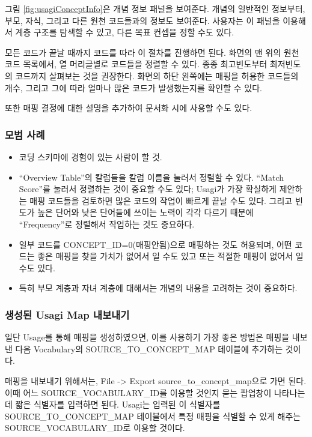 \documentclass[11pt]{book}
\providecommand{\tightlist}{%
  \setlength{\itemsep}{0pt}\setlength{\parskip}{0pt}}
\theoremstyle{definition}
\theoremstyle{definition}
\theoremstyle{definition}
\theoremstyle{remark}
\begin{document}
그림 \ref{fig:usagiConceptInfo}은 개념 정보 패널을 보여준다. 개념의
일반적인 정보부터, 부모, 자식, 그리고 다른 원천 코드들과의 정보도
보여준다. 사용자는 이 패널을 이용해서 계층 구조를 탐색할 수 있고, 다른
목표 컨셉을 정할 수도 있다.

모든 코드가 끝날 때까지 코드를 따라 이 절차를 진행하면 된다. 화면의 맨
위의 원천 코드 목록에서, 열 머리글별로 코드들을 정렬할 수 있다. 종종
최고빈도부터 최저빈도의 코드까지 살펴보는 것을 권장한다. 화면의 하단
왼쪽에는 매핑을 허용한 코드들의 개수, 그리고 그에 따라 얼마나 많은
코드가 발생했는지를 확인할 수 있다.

또한 매핑 결정에 대한 설명을 추가하여 문서화 시에 사용할 수도 있다.

\subsubsection*{모범 사례}\label{-}

\begin{itemize}
\tightlist
\item
  코딩 스키마에 경험이 있는 사람이 할 것.
\item
  ``Overview Table''의 칼럼들을 칼럼 이름을 눌러서 정렬할 수 있다.
  ``Match Score''를 눌러서 정렬하는 것이 중요할 수도 있다; Usagi가 가장
  확실하게 제안하는 매핑 코드들을 검토하면 많은 코드의 작업이 빠르게
  끝날 수도 있다. 그리고 빈도가 높은 단어와 낮은 단어들에 쓰이는 노력이
  각각 다르기 때문에 ``Frequency''로 정렬해서 작업하는 것도 중요하다.
\item
  일부 코드를 CONCEPT\_ID=0(매핑안됨)으로 매핑하는 것도 허용되며, 어떤
  코드는 좋은 매핑을 찾을 가치가 없어서 일 수도 있고 또는 적절한 매핑이
  없어서 일 수도 있다.
\item
  특히 부모 계층과 자녀 계층에 대해서는 개념의 내용을 고려하는 것이
  중요하다.
\end{itemize}

\subsubsection*{생성된 Usagi Map 내보내기}\label{-usagi-map-}

일단 Usage를 통해 매핑을 생성하였으면, 이를 사용하기 가장 좋은 방법은
매핑을 내보낸 다음 Vocabulary의 SOURCE\_TO\_CONCEPT\_MAP 테이블에
추가하는 것이다.

매핑을 내보내기 위해서는, File -\textgreater{} Export
source\_to\_concept\_map으로 가면 된다. 이때 어느
SOURCE\_VOCABULARY\_ID를 이용할 것인지 묻는 팝업창이 나타나는데 짧은
식별자를 입력하면 된다. Usagi는 입력된 이 식별자를
SOURCE\_TO\_CONCEPT\_MAP 테이블에서 특정 매핑을 식별할 수 있게 해주는
SOURCE\_VOCABULARY\_ID로 이용할 것이다.
\end{document}
